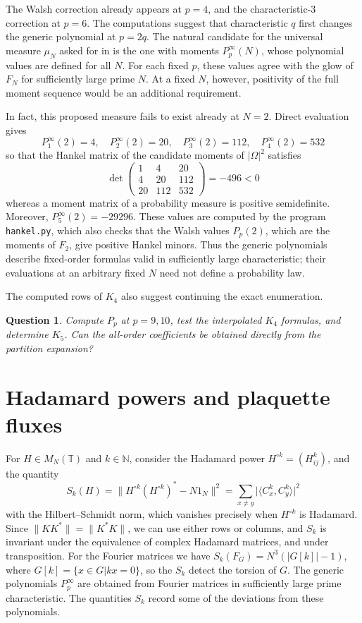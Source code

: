 \documentclass[11pt,a4paper]{article}
\newtheorem{question}[thm]{Question}
\theoremstyle{remark}
\begin{document}
The Walsh correction already appears at $p=4$, and the characteristic-3 correction at $p=6$. The computations suggest that characteristic $q$ first changes the generic polynomial at $p=2q$. The natural candidate for the universal measure $\mu_N$ asked for in \cite[section 4]{banica} is the one with moments $P^\infty_p(N)$, whose polynomial values are defined for all $N$. For each fixed $p$, these values agree with the glow of $F_N$ for sufficiently large prime $N$. At a fixed $N$, however, positivity of the full moment sequence would be an additional requirement.

In fact, this proposed measure fails to exist already at $N=2$. Direct evaluation gives
\[
 P^\infty_1(2)=4,\quad P^\infty_2(2)=20,\quad
 P^\infty_3(2)=112,\quad P^\infty_4(2)=532
\]
so that the Hankel matrix of the candidate moments of $|\Omega|^2$ satisfies
\[
 \det\begin{pmatrix}1&4&20\\4&20&112\\20&112&532\end{pmatrix}=-496<0
\]
whereas a moment matrix of a probability measure is positive semidefinite. Moreover, $P^\infty_5(2)=-29296$. These values are computed by the program \texttt{hankel.py}, which also checks that the Walsh values $P_p(2)$, which are the moments of $F_2$, give positive Hankel minors. Thus the generic polynomials describe fixed-order formulas valid in sufficiently large characteristic; their evaluations at an arbitrary fixed $N$ need not define a probability law.


The computed rows of $K_4$ also suggest continuing the exact enumeration.

\begin{samepage}
\begin{question}\label{que:enumerate}
Compute $P_p$ at $p=9,10$, test the interpolated $K_4$ formulas, and determine $K_5$. Can the all-order coefficients be obtained directly from the partition expansion?
\end{question}
\end{samepage}

\section{Hadamard powers and plaquette fluxes}\label{sec:powers}

For $H\in M_N(\mathbb T)$ and $k\in\mathbb N$, consider the Hadamard power $H^{\circ k}=(H_{ij}^k)$, and the quantity
$$S_k(H)=\big\|H^{\circ k}(H^{\circ k})^*-N1_N\big\|^2=\sum_{x\neq y}\big|\langle C_x^k,C_y^k\rangle\big|^2$$
with the Hilbert--Schmidt norm, which vanishes precisely when $H^{\circ k}$ is Hadamard. Since $\|KK^*\|=\|K^*K\|$, we can use either rows or columns, and $S_k$ is invariant under the equivalence of complex Hadamard matrices, and under transposition. For the Fourier matrices we have $S_k(F_G)=N^3(|G[k]|-1)$, where $G[k]=\{x\in G|kx=0\}$, so the $S_k$ detect the torsion of $G$. The generic polynomials $P^\infty_p$ are obtained from Fourier matrices in sufficiently large prime characteristic. The quantities $S_k$ record some of the deviations from these polynomials.
\end{document}
